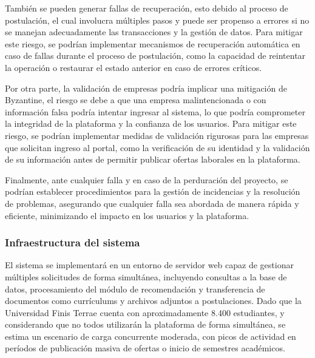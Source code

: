 \documentclass[11pt,a4paper]{Plantilla}
\begin{document}
\vspace{5pt}

También se pueden generar fallas de recuperación, esto debido al proceso de postulación, el cual involucra múltiples pasos y puede ser propenso a errores si no se manejan adecuadamente las transacciones y la gestión de datos. Para mitigar este riesgo, se podrían implementar mecanismos de recuperación automática en caso de fallas durante el proceso de postulación, como la capacidad de reintentar la operación o restaurar el estado anterior en caso de errores críticos.

\vspace{5pt}

Por otra parte, la validación de empresas podría implicar una mitigación de Byzantine, el riesgo se debe a que una empresa malintencionada o con información falsa podría intentar ingresar al sistema, lo que podría comprometer la integridad de la plataforma y la confianza de los usuarios. Para mitigar este riesgo, se podrían implementar medidas de validación rigurosas para las empresas que solicitan ingreso al portal, como la verificación de su identidad y la validación de su información antes de permitir publicar ofertas laborales en la plataforma. 

\vspace{5pt}

Finalmente, ante cualquier falla y en caso de la perduración del proyecto, se podrían establecer procedimientos para la gestión de incidencias y la resolución de problemas, asegurando que cualquier falla sea abordada de manera rápida y eficiente, minimizando el impacto en los usuarios y la plataforma.

\vspace{5pt}

\subsubsection*{Infraestructura del sistema}
El sistema se implementará en un entorno de servidor web capaz de gestionar múltiples solicitudes de forma simultánea, incluyendo consultas a la base de datos, procesamiento del módulo de recomendación y transferencia de documentos como currículums y archivos adjuntos a postulaciones. Dado que la Universidad Finis Terrae cuenta con aproximadamente 8.400 estudiantes, y considerando que no todos utilizarán la plataforma de forma simultánea, se estima un escenario de carga concurrente moderada, con picos de actividad en períodos de publicación masiva de ofertas o inicio de semestres académicos.
\end{document}
